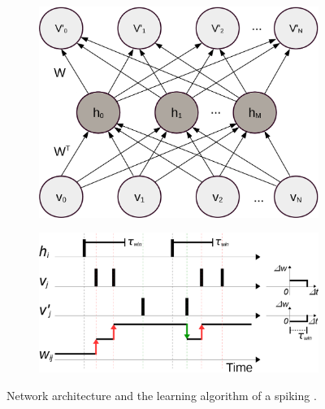 \begin{figure}[th]
	\centering
	\begin{subfigure}[t]{0.35\textwidth}
		\includegraphics[width=\textwidth]{pics_sdlm/AE.png}
	\end{subfigure}
	\begin{subfigure}[t]{0.6\textwidth}
		\includegraphics[width=\textwidth]{pics_sdlm/rSTDP.png}
	\end{subfigure}
	\caption{Network architecture and the learning algorithm of a spiking \DIFdelbeginFL {}\DIFdelendFL \DIFaddbeginFL {}\DIFaddendFL .}
	\label{fig:rSTDP}
\end{figure}

